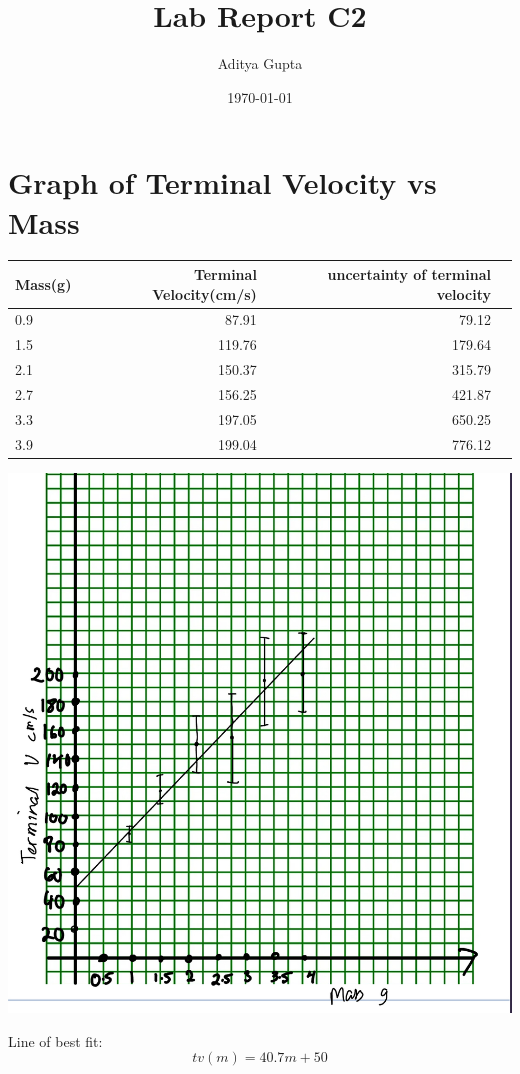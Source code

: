 \documentclass[12pt, letterpaper]{article}
\title{Lab Report C2}
\author{Aditya Gupta}
\date{\today}
\begin{document}
\maketitle
\newpage
\tableofcontents
\newpage
\section{Graph of Terminal Velocity vs Mass}
\begin{table}[!htp]\centering
\scriptsize
\begin{tabular}{lrrr}\toprule
Mass(g) &Terminal Velocity(cm/s) &uncertainty of terminal velocity \\\midrule
0.9 &87.91 &79.12 \\
1.5 &119.76 &179.64 \\
2.1 &150.37 &315.79 \\
2.7 &156.25 &421.87 \\
3.3 &197.05 &650.25 \\
3.9 &199.04 &776.12 \\
\bottomrule
\end{tabular}
\end{table}
\includegraphics[width=1\linewidth]{printable-quarter_inch_green_graph_paper-4x.jpeg}

Line of best fit:
\[
tv(m) = 40.7m + 50
\]
\end{document}
